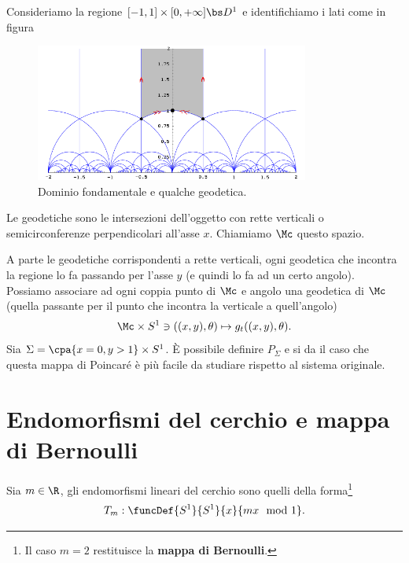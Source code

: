 \begin{definition}
Consideriamo la regione $[-1,1]\times [0,+\infty]\bs D^1$ e identifichiamo i lati come in figura
\begin{figure}[!htb]
    \centering
    \includegraphics[width=9cm]{Immagini/ModularGroup-FundamentalDomain-01.png}
    \caption{Dominio fondamentale e qualche geodetica.}
    \label{SemipianoPoincare}
\end{figure}

\noindent
Le geodetiche sono le intersezioni dell'oggetto con rette verticali o semicirconferenze perpendicolari all'asse $x$.
Chiamiamo $\Mc$ questo spazio.
\end{definition}
\begin{example}
A parte le geodetiche corrispondenti a rette verticali, ogni geodetica che incontra la regione lo fa passando per l'asse $y$ (e quindi lo fa ad un certo angolo). Possiamo associare ad ogni coppia punto di $\Mc$ e angolo una geodetica di $\Mc$ (quella passante per il punto che incontra la verticale a quell'angolo)
\[\Mc\times S^1\ni ((x,y),\theta)\mapsto g_t((x,y),\theta).\]
Sia $\Sigma=\cpa{x=0,y>1}\times S^1$. \`E possibile definire $P_\Sigma$ e si da il caso che questa mappa di Poincar\'e \`e pi\`u facile da studiare rispetto al sistema originale.
\end{example}

\section{Endomorfismi del cerchio e mappa di Bernoulli}
\begin{definition}
Sia $m\in\R$, gli endomorfismi lineari del cerchio sono quelli della forma\footnote{Il caso $m=2$ restituisce la \textbf{mappa di Bernoulli}.}
\[T_m:\funcDef{S^1}{S^1}{x}{mx\mod 1}.\]
\end{definition}

